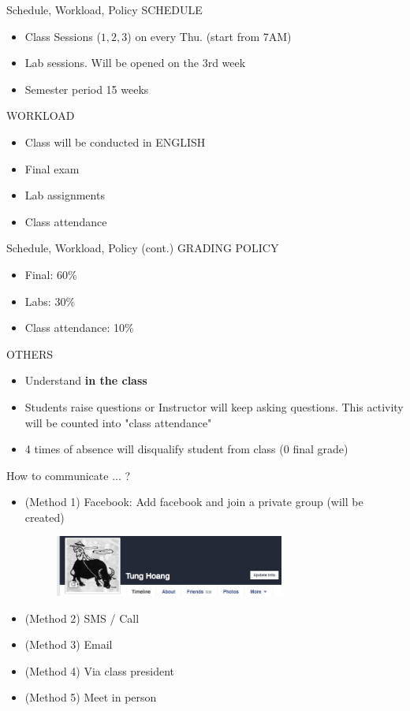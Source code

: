 \documentclass[16pt]{beamer}
\begin{document}
\begin{frame}{Schedule, Workload, Policy}
SCHEDULE
\begin{itemize}
    \item Class Sessions ($1,2,3$) on every Thu. (start from 7AM)
    \item Lab sessions. Will be opened on the 3rd week
    \item Semester period 15 weeks
\end{itemize}

WORKLOAD
\begin{itemize}
    \item Class will be conducted in ENGLISH
    \item Final exam
    \item Lab assignments
    \item Class attendance
\end{itemize}
\end{frame}

\begin{frame}{Schedule, Workload, Policy (cont.)}
GRADING POLICY
\begin{itemize}
    \item Final: 60\%
    \item Labs: 30\%
    \item Class attendance: 10\%
\end{itemize}
OTHERS
\begin{itemize}
    \item Understand \textbf{in the class}
    \item Students raise questions or Instructor will keep asking questions. This activity will be counted into "class attendance"
    \item 4 times of absence will disqualify student from class (0 final grade)
\end{itemize}
\end{frame}

\begin{frame}{How to communicate ... ?}
\begin{itemize}
    \item (Method 1) Facebook: Add facebook and join a private group (will be created)
    \begin{figure}[p]
    \includegraphics[height=2cm]{Facebook.png}
    \end{figure}
    \item (Method 2) SMS / Call
    \item (Method 3) Email
    \item (Method 4) Via class president
    \item (Method 5) Meet in person
\end{itemize}
\end{frame}

\end{document}
